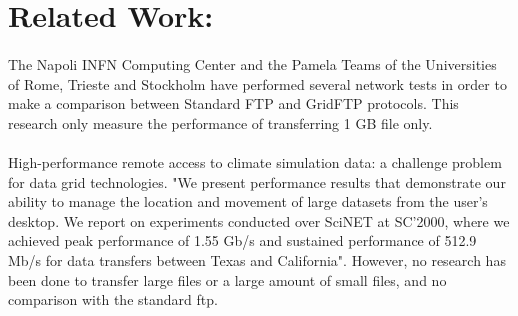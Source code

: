 \section{Related Work:}
\paragraph{}

The Napoli INFN Computing Center and the Pamela Teams of the Universities of Rome, Trieste and Stockholm have performed several network tests in order to make a comparison between Standard FTP and GridFTP protocols\cite{rw1}. This research only measure the performance of transferring 1 GB file only.

\paragraph{}
High-performance remote access to climate simulation data: a challenge problem for data grid technologies. "We present performance results that demonstrate our ability to manage the location and movement of large datasets from the user’s desktop. We report on experiments conducted over SciNET at SC’2000, where we achieved peak performance of 1.55 Gb/s and sustained performance of 512.9 Mb/s for data transfers between Texas and California"\cite{rw2}. However, no research has been done to transfer large files or a large amount of small files, and no comparison with the standard ftp. 

